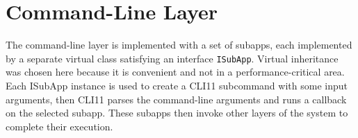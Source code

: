 \section{Command-Line Layer}
The command-line layer is implemented with a set of subapps, each implemented by a separate virtual class satisfying an interface \texttt{ISubApp}.
Virtual inheritance was chosen here because it is convenient and not in a performance-critical area.
Each ISubApp instance is used to create a CLI11 subcommand with some input arguments, then CLI11 parses the command-line arguments and runs a callback on the selected subapp.
These subapps then invoke other layers of the system to complete their execution.